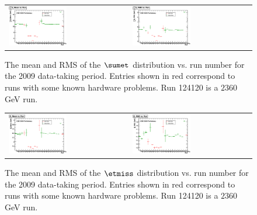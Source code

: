 \begin{figure}[h!]
  \centering
  \begin{tabular}{ll}
    \includegraphics[width=0.5\textwidth]{plots_METStability/h_caloSumetMean_vs_run.eps} &
    \includegraphics[width=0.5\textwidth]{plots_METStability/h_caloSumetRMS_vs_run.eps} \\
  \end{tabular}
 \caption{\small The mean and RMS of the $\sumet$ distribution vs. run number for the 2009 data-taking period.
          Entries shown in red correspond to runs with some known hardware problems. Run 124120 is a $2360$ GeV run.
          \label{fig:SumET_vs_run}}
      \end{figure}

\begin{figure}[h!]
  \centering
  \begin{tabular}{ll}
    \includegraphics[width=0.5\textwidth]{plots_METStability/h_calometPtMean_vs_run.eps} &
    \includegraphics[width=0.5\textwidth]{plots_METStability/h_calometPtRMS_vs_run.eps} \\
  \end{tabular}
  \caption{\small The mean and RMS of the $\etmiss$ distribution vs. run
    number for the 2009 data-taking period.  Entries shown in red
    correspond to runs with some known hardware problems. Run 124120 is a $2360$ GeV run.\label{fig:MET_vs_run}}
\end{figure}

